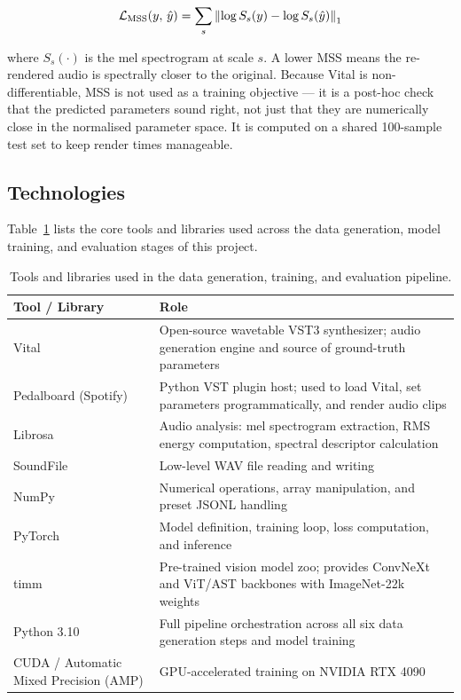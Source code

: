 \begin{equation}
\mathcal{L}_{\text{MSS}}(y,\, \hat{y}) = \sum_{s} \left\| \log S_s(y) - \log S_s(\hat{y}) \right\|_1
\label{eq:mss}\eqname{Multi-Scale Spectral loss}
\end{equation}

\noindent where $S_s(\cdot)$ is the mel spectrogram at scale $s$. A lower MSS means the re-rendered audio is spectrally closer to the original. Because Vital is non-differentiable, MSS is not used as a training objective — it is a post-hoc check that the predicted parameters sound right, not just that they are numerically close in the normalised parameter space. It is computed on a shared 100-sample test set to keep render times manageable.

\subsection{Technologies}

Table~\ref{tab:technologies} lists the core tools and libraries used across the data generation, model training, and evaluation stages of this project.

\begin{table}[H]
\centering
\renewcommand{\arraystretch}{1.3}
\begin{tabular}{p{3.2cm} p{10cm}}
\hline
\textbf{Tool / Library} & \textbf{Role} \\
\hline
Vital                   & Open-source wavetable VST3 synthesizer; audio generation engine and source of ground-truth parameters \\
Pedalboard (Spotify)    & Python VST plugin host; used to load Vital, set parameters programmatically, and render audio clips \\
Librosa                 & Audio analysis: mel spectrogram extraction, RMS energy computation, spectral descriptor calculation \\
SoundFile               & Low-level WAV file reading and writing \\
NumPy                   & Numerical operations, array manipulation, and preset JSONL handling \\
PyTorch                 & Model definition, training loop, loss computation, and inference \\
timm                    & Pre-trained vision model zoo; provides ConvNeXt and ViT/AST backbones with ImageNet-22k weights \\
Python 3.10             & Full pipeline orchestration across all six data generation steps and model training \\
CUDA / Automatic Mixed Precision (AMP) & GPU-accelerated training on NVIDIA RTX 4090 \\
\hline
\end{tabular}
\vspace{0.3cm}
\caption{Tools and libraries used in the data generation, training, and evaluation pipeline.}
\label{tab:technologies}
\end{table}

